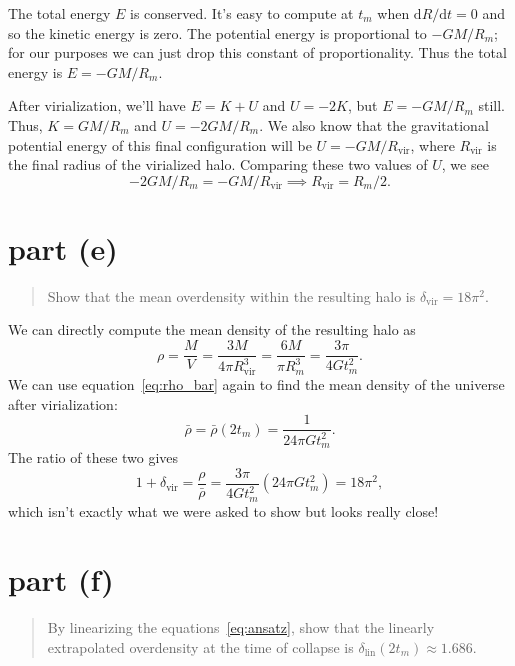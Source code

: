 \documentclass{article}
\renewcommand{\d}{\mathrm{d}}
\begin{document}
The total energy $E$ is conserved. It's easy to compute at $t_m$ when $\d R/\d
t = 0$ and so the kinetic energy is zero. The potential energy is proportional
to $-GM/R_m$; for our purposes we can just drop this constant of
proportionality. Thus the total energy is $E = - GM/R_m$.

After virialization, we'll have $E = K + U$ and $U = - 2K$, but $E = - GM/R_m$
still. Thus, $K = GM/R_m$ and $U = -2 GM/R_m$. We also know that the
gravitational potential energy of this final configuration will be $U = -
GM/R_\text{vir}$, where $R_\text{vir}$ is the final radius of the virialized
halo. Comparing these two values of $U$, we see
\begin{equation}
	-2 GM/R_m
	= - GM/R_\text{vir}
	\implies
	R_\text{vir} = R_m / 2.
\end{equation}


\section*{part (e)}

\begin{quote}
	Show that the mean overdensity within the resulting halo is
	$\delta_\text{vir} = 18 \pi^2$.
\end{quote}

We can directly compute the mean density of the resulting halo as
\begin{equation}
	\rho
	= \frac{M}{V}
	= \frac{3M}{4\pi R_\text{vir}^3}
	= \frac{6M}{\pi R_m^3}
	= \frac{3 \pi}{4 G t_m^2}.
\end{equation}
We can use equation~\ref{eq:rho_bar} again to find the mean density of the
universe after virialization:
\begin{equation}
	\bar\rho = \bar\rho(2 t_m) = \frac{1}{24 \pi G t_m^2}.
\end{equation}
The ratio of these two gives
\begin{equation}
	1 + \delta_\text{vir}
	= \frac{\rho}{\bar\rho}
	= \frac{3 \pi}{4 G t_m^2} (24 \pi G t_m^2)
	= 18 \pi^2,
\end{equation}
which isn't exactly what we were asked to show but looks really close!


\section*{part (f)}

\begin{quote}
	By linearizing the equations~\ref{eq:ansatz}, show that the linearly
	extrapolated overdensity at the time of collapse is
	$\delta_\text{lin}(2 t_m) \approx 1.686$.
\end{quote}
\end{document}
